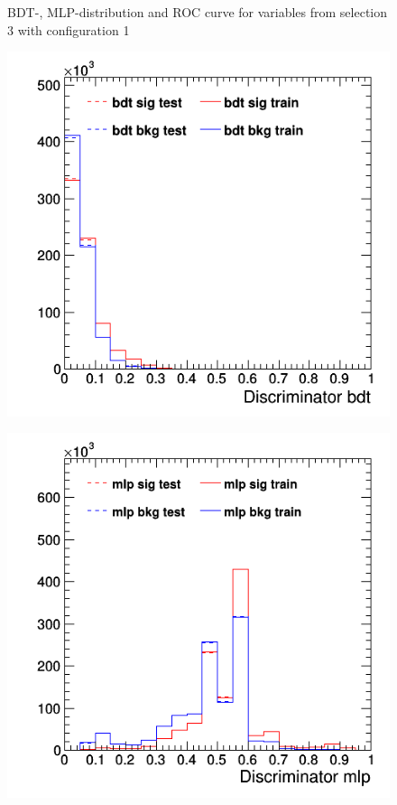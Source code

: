 \documentclass[11pt]{scrartcl}
\begin{document}
\begin{figure}[H]
	\caption{BDT-, MLP-distribution and ROC curve for variables from selection 3 with configuration 1}
	 \label{fig:ROC_s3_config1}
	\end{figure}
	
	\begin{figure}[H]
	\centering
	\begin{minipage}{.5\textwidth}
	  \centering
	  \includegraphics[width=0.75\linewidth]{figures/MVA/select3/config2/discriminator_bdt.png}
	  \label{fig:distr_s3_config2_bdt}
	\end{minipage}%
	\begin{minipage}{.5\textwidth}
	  \centering
	  \includegraphics[width=0.75\linewidth]{figures/MVA/select3/config2/discriminator_mlp.png}

\end{minipage}
\end{figure}
\end{document}
